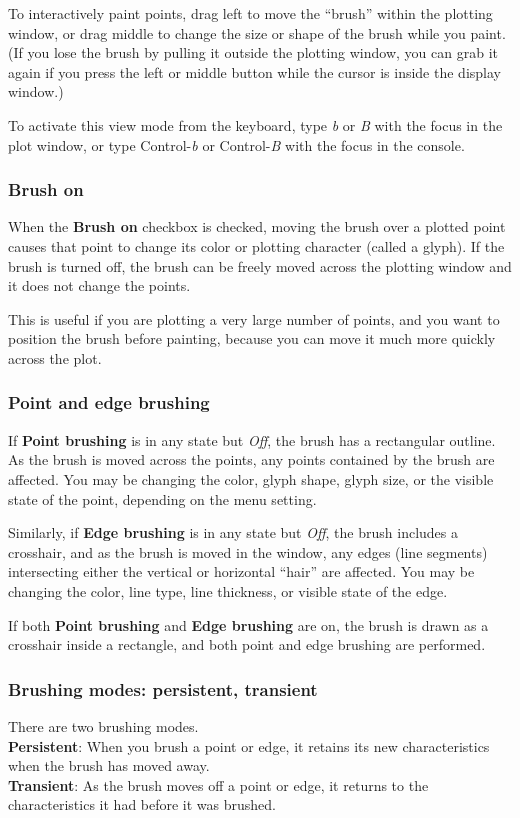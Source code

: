 \documentclass[11pt]{article}
\begin{document}
To interactively paint points, drag left to move the ``brush'' within
the plotting window, or drag middle to change the size or shape of
the brush while you paint.  (If you lose the brush by pulling it
outside the plotting window, you can grab it again if you press the
left or middle button while the cursor is inside the display window.)

To activate this view mode from the keyboard, type {\em b} or {\em B}
with the focus in the plot window, or type Control-{\em b} or
Control-{\em B} with the focus in the console.

\subsubsection{Brush on}
%
When the {\bf Brush on} checkbox is checked, moving the brush
over a plotted point causes that point to change its color or
plotting character (called a glyph).  If the brush is turned off, the
brush can be freely moved across the plotting window and it does not
change the points.

This is useful if you are plotting a very large number of points,
and you want to position the brush before painting, because you
can move it much more quickly across the plot.  

\subsubsection{Point and edge brushing}
%
If {\bf Point brushing} is in any state but {\it Off}, the brush has a
rectangular outline.  As the brush is moved across the points, any
points contained by the brush are affected.  You may be changing the
color, glyph shape, glyph size, or the visible state of the point,
depending on the menu setting.

Similarly, if {\bf Edge brushing} is in any state but {\it Off}, the
brush includes a crosshair, and as the brush is moved in the window,
any edges (line segments) intersecting either the vertical or
horizontal ``hair'' are affected.  You may be changing the color,
line type, line thickness, or visible state of the edge.

If both {\bf Point brushing} and {\bf Edge brushing} are on, the
brush is drawn as a crosshair inside a rectangle, and both point and
edge brushing are performed.

\subsubsection{Brushing modes:  persistent, transient}
%
There are two brushing modes.
\medskip
\noindent
\\{\bf Persistent}:  When you brush a point or edge, it retains its new
  characteristics when the brush has moved away.
\\{\bf Transient}:  As the brush moves off a point or edge, it returns
  to the characteristics it had before it was brushed.
\end{document}
